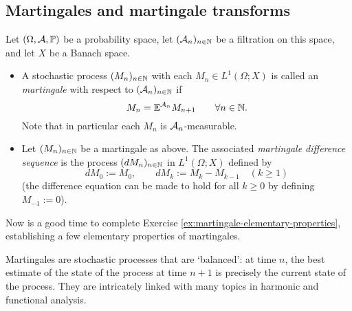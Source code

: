 \subsection{Martingales and martingale transforms}

\begin{defn}
  Let $(\Omega, \mathcal{A}, \mathbb{P})$ be a probability space, let $(\mathcal{A}_n)_{n \in \mathbb{N}}$ be a filtration on this space,  and let $X$ be a Banach space.
  \begin{itemize}
  \item
    A stochastic process $(M_n)_{n \in \mathbb{N}}$ with each $M_n \in L^1(\Omega; X)$ is called an \emph{martingale} with respect to $(\mathcal{A}_n)_{n \in \mathbb{N}}$ if 
    \begin{equation}\label{eq:mgale-defining-property}
      M_n = \mathbb{E}^{\mathcal{A}_n} M_{n+1} \qquad \forall n \in \mathbb{N}.
    \end{equation}
    Note that in particular each $M_n$ is $\mathcal{A}_n$-measurable.

  \item
    Let $(M_n)_{n \in \mathbb{N}}$ be a martingale as above.
    The associated \emph{martingale difference sequence} is the process $(dM_n)_{n \in \mathbb{N}}$ in $L^1(\Omega; X)$ defined by
    \begin{equation*}
      dM_0 := M_0, \qquad dM_k := M_k - M_{k-1} \quad (k \geq 1)
    \end{equation*}
    (the difference equation can be made to hold for all $k \geq 0$ by defining $M_{-1} := 0$).
  \end{itemize}
\end{defn}

\begin{rmk}
  Now is a good time to complete Exercise \ref{ex:martingale-elementary-properties}, establishing a few elementary properties of martingales. 
\end{rmk}

Martingales are stochastic processes that are `balanced': at time $n$, the best estimate of the state of the process at time $n+1$ is precisely the current state of the process.
They are intricately linked with many topics in harmonic and functional analysis.

